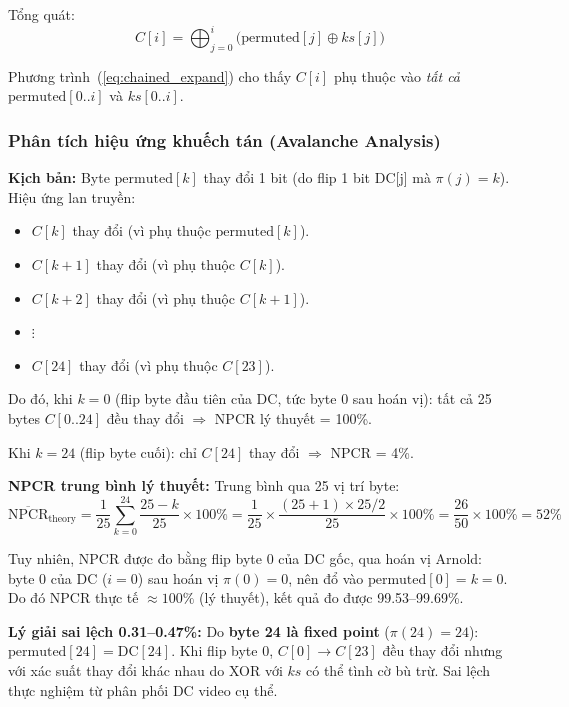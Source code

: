 Tổng quát:
\begin{equation}
C[i] = \bigoplus_{j=0}^{i} \bigl(\text{permuted}[j] \oplus ks[j]\bigr)
\label{eq:chained_expand}
\end{equation}

Phương trình~(\ref{eq:chained_expand}) cho thấy $C[i]$ phụ thuộc vào \emph{tất cả}
$\text{permuted}[0..i]$ và $ks[0..i]$.

\subsubsection{Phân tích hiệu ứng khuếch tán (Avalanche Analysis)}

\textbf{Kịch bản:} Byte $\text{permuted}[k]$ thay đổi 1 bit (do flip 1 bit DC[j] mà $\pi(j) = k$).
Hiệu ứng lan truyền:

\begin{itemize}
  \item $C[k]$ thay đổi (vì phụ thuộc $\text{permuted}[k]$).
  \item $C[k+1]$ thay đổi (vì phụ thuộc $C[k]$).
  \item $C[k+2]$ thay đổi (vì phụ thuộc $C[k+1]$).
  \item $\vdots$
  \item $C[24]$ thay đổi (vì phụ thuộc $C[23]$).
\end{itemize}

Do đó, khi $k = 0$ (flip byte đầu tiên của DC, tức byte 0 sau hoán vị):
tất cả 25 bytes $C[0..24]$ đều thay đổi $\Rightarrow$ NPCR lý thuyết = 100\%.

Khi $k = 24$ (flip byte cuối): chỉ $C[24]$ thay đổi $\Rightarrow$ NPCR = 4\%.

\textbf{NPCR trung bình lý thuyết:} Trung bình qua 25 vị trí byte:
\begin{equation}
\overline{\text{NPCR}}_{\text{theory}} = \frac{1}{25}\sum_{k=0}^{24} \frac{25 - k}{25} \times 100\%
= \frac{1}{25} \times \frac{(25+1) \times 25/2}{25} \times 100\% = \frac{26}{50} \times 100\% = 52\%
\end{equation}

Tuy nhiên, NPCR được đo bằng flip byte 0 của DC gốc, qua hoán vị Arnold:
byte 0 của DC ($i=0$) sau hoán vị $\pi(0) = 0$, nên đổ vào $\text{permuted}[0] = k = 0$.
Do đó NPCR thực tế $\approx 100\%$ (lý thuyết), kết quả đo được 99.53--99.69\%.

\textbf{Lý giải sai lệch 0.31--0.47\%:}
Do \textbf{byte 24 là fixed point} ($\pi(24) = 24$): $\text{permuted}[24] = \text{DC}[24]$.
Khi flip byte 0, $C[0] \to C[23]$ đều thay đổi nhưng với xác suất thay đổi khác nhau
do XOR với $ks$ có thể tình cờ bù trừ. Sai lệch thực nghiệm từ phân phối DC video cụ thể.

